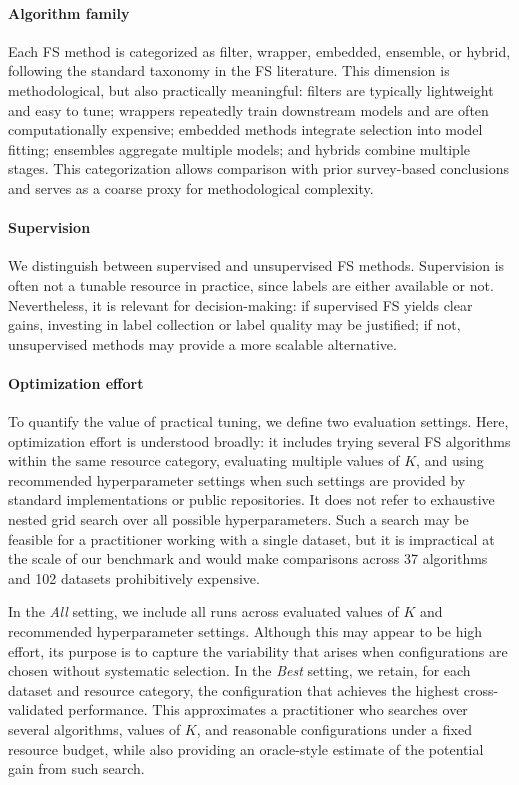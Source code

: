 \documentclass[preprint,12pt,authoryear]{elsarticle}
\begin{document}
{\paragraph{Algorithm family}
Each FS method is categorized as filter, wrapper, embedded, ensemble, or hybrid, following the standard taxonomy in the FS literature. This dimension is methodological, but also practically meaningful: filters are typically lightweight and easy to tune; wrappers repeatedly train downstream models and are often computationally expensive; embedded methods integrate selection into model fitting; ensembles aggregate multiple models; and hybrids combine multiple stages. This categorization allows comparison with prior survey-based conclusions and serves as a coarse proxy for methodological complexity.

\paragraph{Supervision}
We distinguish between supervised and unsupervised FS methods. Supervision is often not a tunable resource in practice, since labels are either available or not. Nevertheless, it is relevant for decision-making: if supervised FS yields clear gains, investing in label collection or label quality may be justified; if not, unsupervised methods may provide a more scalable alternative.

\paragraph{Optimization effort}
To quantify the value of practical tuning, we define two evaluation settings. Here, optimization effort is understood broadly: it includes trying several FS algorithms within the same resource category, evaluating multiple values of $K$, and using recommended hyperparameter settings when such settings are provided by standard implementations or public repositories. It does not refer to exhaustive nested grid search over all possible hyperparameters. Such a search may be feasible for a practitioner working with a single dataset, but it is impractical at the scale of our benchmark and would make comparisons across 37 algorithms and 102 datasets prohibitively expensive.

In the \emph{All} setting, we include all runs across evaluated values of $K$ and recommended hyperparameter settings. Although this may appear to be high effort, its purpose is to capture the variability that arises when configurations are chosen without systematic selection. In the \emph{Best} setting, we retain, for each dataset and resource category, the configuration that achieves the highest cross-validated performance. This approximates a practitioner who searches over several algorithms, values of $K$, and reasonable configurations under a fixed resource budget, while also providing an oracle-style estimate of the potential gain from such search.

}
\end{document}
